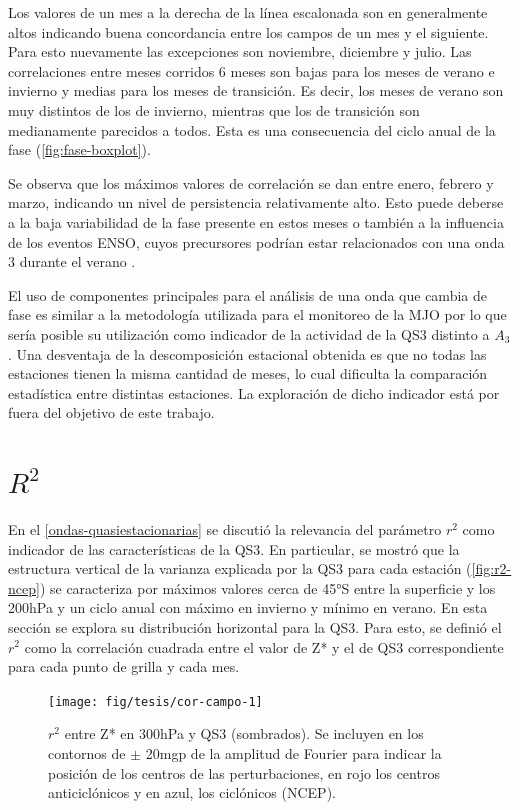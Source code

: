 \documentclass[spanish,a4paper,12pt,oneside]{book}
\begin{document}
Los valores de un mes a la derecha de la línea escalonada son en
generalmente altos indicando buena concordancia entre los campos de un
mes y el siguiente. Para esto nuevamente las excepciones son noviembre,
diciembre y julio. Las correlaciones entre meses corridos 6 meses son
bajas para los meses de verano e invierno y medias para los meses de
transición. Es decir, los meses de verano son muy distintos de los de
invierno, mientras que los de transición son medianamente parecidos a
todos. Esta es una consecuencia del ciclo anual de la fase
(\autoref{fig:fase-boxplot}).

Se observa que los máximos valores de correlación se dan entre enero,
febrero y marzo, indicando un nivel de persistencia relativamente alto.
Esto puede deberse a la baja variabilidad de la fase presente en estos
meses o también a la influencia de los eventos ENSO, cuyos precursores
podrían estar relacionados con una onda 3 durante el verano
\citep{Qin2017}.

El uso de componentes principales para el análisis de una onda que
cambia de fase es similar a la metodología utilizada para el monitoreo
de la MJO \citep{Wheeler2004} por lo que sería posible su utilización
como indicador de la actividad de la QS3 distinto a \(A_3\). Una
desventaja de la descomposición estacional obtenida es que no todas las
estaciones tienen la misma cantidad de meses, lo cual dificulta la
comparación estadística entre distintas estaciones. La exploración de
dicho indicador está por fuera del objetivo de este trabajo.

\section{\texorpdfstring{\(R^2\)}{R\^{}2}}\label{r2}

En el \autoref{ondas-quasiestacionarias} se discutió la relevancia del
parámetro \(r^2\) como indicador de las características de la QS3. En
particular, se mostró que la estructura vertical de la varianza
explicada por la QS3 para cada estación (\autoref{fig:r2-ncep}) se
caracteriza por máximos valores cerca de 45°S entre la superficie y los
200hPa y un ciclo anual con máximo en invierno y mínimo en verano. En
esta sección se explora su distribución horizontal para la QS3. Para
esto, se definió el \(r^2\) como la correlación cuadrada entre el valor
de Z* y el de QS3 correspondiente para cada punto de grilla y cada mes.

\begin{figure}
\texttt{[image: fig/tesis/cor-campo-1]} \caption{$r^2$ entre Z* en 300hPa y QS3 (sombrados). Se incluyen en  los contornos de $\pm$ 20mgp de la amplitud de Fourier para indicar la posición de los centros de las perturbaciones, en rojo los centros anticiclónicos y en azul, los ciclónicos (NCEP).}\label{fig:cor-campo}
\end{figure}
\end{document}
